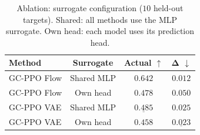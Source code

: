 \begin{table}[t]
\centering
\caption{Ablation: surrogate configuration ($10$ held-out targets). Shared: all methods use the MLP surrogate. Own head: each model uses its prediction head.}
\label{tab:ablation}
\small
\begin{tabular}{lccc}
\toprule
\textbf{Method} & \textbf{Surrogate} & \textbf{Actual} $\uparrow$ & $\boldsymbol{\Delta}$ $\downarrow$ \\
\midrule
GC-PPO Flow & Shared MLP & $\mathbf{0.642}$ & $\mathbf{0.012}$ \\
GC-PPO Flow & Own head & $0.478$ & $0.050$ \\
\midrule
GC-PPO VAE & Shared MLP & $\underline{0.485}$ & $0.025$ \\
GC-PPO VAE & Own head & $0.458$ & $\underline{0.023}$ \\
\bottomrule
\end{tabular}
\end{table}